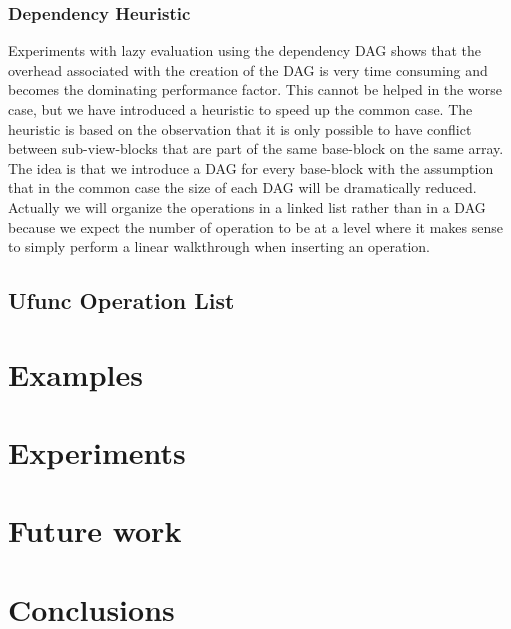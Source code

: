 \documentclass[preprint]{../PGAS10/sigplanconf}
\begin{document}
\subsubsection{Dependency Heuristic}
Experiments with lazy evaluation using the dependency DAG shows that the overhead associated with the creation of the DAG is very time consuming and becomes the dominating performance factor. This cannot be helped in the worse case, but we have introduced a heuristic to speed up the common case. The heuristic is based on the observation that it is only possible to have conflict between sub-view-blocks that are part of the same base-block on the same array. The idea is that we introduce a DAG for every base-block with the assumption that in the common case the size of each DAG will be dramatically reduced. Actually we will organize the operations in a linked list rather than in a DAG because we expect the number of operation to be at a level where it makes sense to simply perform a linear walkthrough when inserting an operation.













\subsection{Ufunc Operation List}




\section{Examples}


\section{Experiments}


\section{Future work}


\section{Conclusions}




\end{document}
